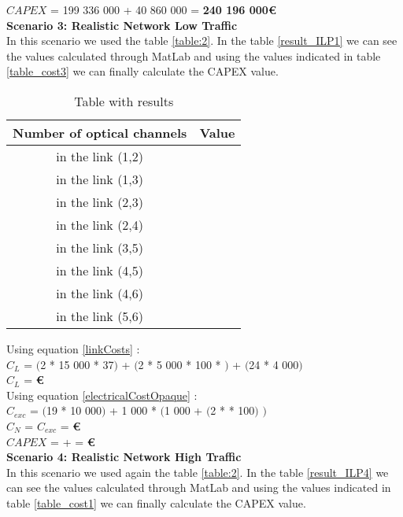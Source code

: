 $CAPEX$ = 199 336 000 + 40 860 000 = \textbf{240 196 000\euro}\\


\vspace{11pt}
\textbf{Scenario 3: Realistic Network Low Traffic} \label{Scenario3_opaque} \\
In this scenario we used the table \ref{table:2}. In the table \ref{result_ILP1} we can see the values calculated through MatLab and using the values indicated in table \ref{table_cost3} we can finally calculate the CAPEX value. \\
\newpage
\begin{table}[h!]
\centering
\begin{tabular}{|| c | c||}
 \hline
 Number of optical channels & Value \\
 \hline\hline
 in the link (1,2) &  \\
 in the link (1,3) &  \\
 in the link (2,3) &  \\
 in the link (2,4) &  \\
 in the link (3,5) &  \\
 in the link (4,5) &  \\
 in the link (4,6) &  \\
 in the link (5,6) &  \\
 \hline
\end{tabular}
\caption{Table with results}
\label{result_ILP3}
\end{table}


Using equation \ref{linkCosts} : \\
$C_L$ = $($2 * 15 000 * 37$)$ + $($2 * 5 000 * 100 * $)$ + $($24 * 4 000$)$ \\
$C_L$ = \textbf{ \euro} \\

Using equation \ref{electricalCostOpaque} : \\
$C_{exc}$ = $($19 * 10 000$)$ + 1 000 * $($1 000 + $($2 *  * 100$)$ $)$ \\
$C_N$ = $C_{exc}$ = \textbf{ \euro} \\

$CAPEX$ =  +  = \textbf{ \euro}\\


\vspace{11pt}
\textbf{Scenario 4: Realistic Network High Traffic} \label{Scenario4_opaque} \\
In this scenario we used again the table \ref{table:2}. In the table \ref{result_ILP4} we can see the values calculated through MatLab and using the values indicated in table \ref{table_cost1} we can finally calculate the CAPEX value. \\

